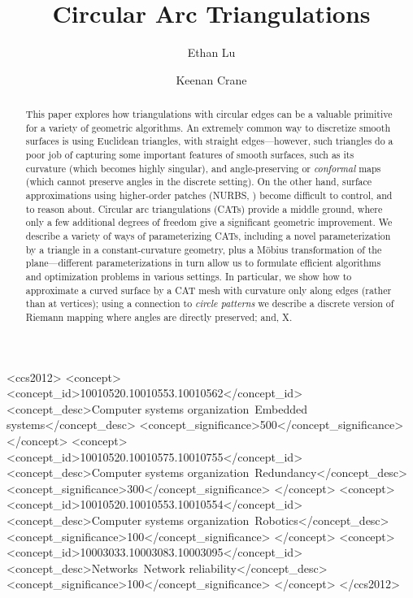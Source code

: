 \documentclass[acmtog]{acmart}
\begin{document}
\title{Circular Arc Triangulations} 
\author{Ethan Lu} 
\author{Keenan Crane} 

\renewcommand\shortauthors{Ethan Lu and Keenan Crane}

\begin{abstract}
   This paper explores how triangulations with circular edges can be a valuable primitive for a variety of geometric algorithms.  An extremely common way to discretize smooth surfaces is using Euclidean triangles, with straight edges---however, such triangles do a poor job of capturing some important features of smooth surfaces, such as its curvature (which becomes highly singular), and angle-preserving or \emph{conformal} maps (which cannot preserve angles in the discrete setting).  On the other hand, surface approximations using higher-order patches (NURBS, \etc{}) become difficult to control, and to reason about.  Circular arc triangulations (CATs) provide a middle ground, where only a few additional degrees of freedom give a significant geometric improvement.  We describe a variety of ways of parameterizing CATs, including a novel parameterization by a triangle in a constant-curvature geometry, plus a M\"{o}bius transformation of the plane---different parameterizations in turn allow us to formulate efficient algorithms and optimization problems in various settings.  In particular, we show how to approximate a curved surface by a CAT mesh with curvature only along edges (rather than at vertices); using a connection to \emph{circle patterns} we describe a discrete version of Riemann mapping where angles are directly preserved; and, X.
\end{abstract}


%
%
\begin{CCSXML}
<ccs2012>
 <concept>
  <concept_id>10010520.10010553.10010562</concept_id>
  <concept_desc>Computer systems organization~Embedded systems</concept_desc>
  <concept_significance>500</concept_significance>
 </concept>
 <concept>
  <concept_id>10010520.10010575.10010755</concept_id>
  <concept_desc>Computer systems organization~Redundancy</concept_desc>
  <concept_significance>300</concept_significance>
 </concept>
 <concept>
  <concept_id>10010520.10010553.10010554</concept_id>
  <concept_desc>Computer systems organization~Robotics</concept_desc>
  <concept_significance>100</concept_significance>
 </concept>
 <concept>
  <concept_id>10003033.10003083.10003095</concept_id>
  <concept_desc>Networks~Network reliability</concept_desc>
  <concept_significance>100</concept_significance>
 </concept>
</ccs2012>  
\end{CCSXML}
\end{document}
